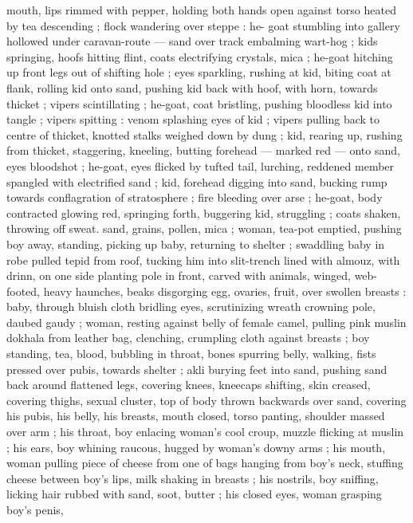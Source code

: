 {mouth, lips rimmed with pepper, holding both hands open against 
torso heated by tea descending ; flock wandering over steppe : he- 
goat stumbling into gallery hollowed under caravan-route --- sand 
over track embalming wart-hog ; kids springing, hoofs hitting flint, 
coats electrifying crystals, mica ; he-goat hitching up front legs out 
of shifting hole ; eyes sparkling, rushing at kid, biting coat at flank, 
rolling kid onto sand, pushing kid back with hoof, with horn, towards 
thicket ; vipers scintillating ; he-goat, coat bristling, pushing 
bloodless kid into tangle ; vipers spitting : venom splashing eyes of 
kid ; vipers pulling back to centre of thicket, knotted stalks weighed 
down by dung ; kid, rearing up, rushing from thicket, staggering, 
kneeling, butting forehead --- marked red --- onto sand, eyes 
bloodshot ; he-goat, eyes flicked by tufted tail, lurching, reddened 
member spangled with electrified sand ; kid, forehead digging into 
sand, bucking rump towards conflagration of stratosphere ; fire 
bleeding over arse ; he-goat, body contracted glowing red, springing 
forth, buggering kid, struggling ; coats shaken, throwing off sweat. 
sand, grains, pollen, mica ; woman, tea-pot emptied, pushing boy 
away, standing, picking up baby, returning to shelter ; swaddling 
baby in robe pulled tepid from roof, tucking him into slit-trench lined 
with almouz, with drinn, on one side planting pole in front, carved 
with animals, winged, web-footed, heavy haunches, beaks disgorging 
egg, ovaries, fruit, over swollen breasts : baby, through bluish cloth 
bridling eyes, scrutinizing wreath crowning pole, daubed gaudy ; 
woman, resting against belly of female camel, pulling pink muslin 
dokhala from leather bag, clenching, crumpling cloth against breasts 
; boy standing, tea, blood, bubbling in throat, bones spurring belly, 
walking, fists pressed over pubis, towards shelter ; akli burying feet 
into sand, pushing sand back around flattened legs, covering knees, 
kneecaps shifting, skin creased, covering thighs, sexual cluster, top 
of body thrown backwards over sand, covering his pubis, his belly, 
his breasts, mouth closed, torso panting, shoulder massed over arm 
; his throat, boy enlacing woman's cool croup, muzzle flicking at 
muslin ; his ears, boy whining raucous, hugged by woman's downy 
arms ; his mouth, woman pulling piece of cheese from one of bags 
hanging from boy's neck, stuffing cheese between boy's lips, milk 
shaking in breasts ; his nostrils, boy sniffing, licking hair rubbed with 
sand, soot, butter ; his closed eyes, woman grasping boy's penis, 
}

